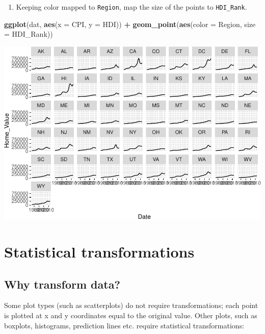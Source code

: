 \documentclass[
]{book}
\newenvironment{Shaded}{\begin{snugshade}}{\end{snugshade}}
\newcommand{\DataTypeTok}[1]{\textcolor[rgb]{0.13,0.29,0.53}{#1}}
\newcommand{\KeywordTok}[1]{\textcolor[rgb]{0.13,0.29,0.53}{\textbf{#1}}}
\newcommand{\NormalTok}[1]{#1}
\newcommand{\OperatorTok}[1]{\textcolor[rgb]{0.81,0.36,0.00}{\textbf{#1}}}
\providecommand{\tightlist}{%
  \setlength{\itemsep}{0pt}\setlength{\parskip}{0pt}}
\begin{document}
\begin{enumerate}
\def\labelenumi{\arabic{enumi}.}
\setcounter{enumi}{4}
\tightlist
\item
  Keeping color mapped to \texttt{Region}, map the size of the points to \texttt{HDI\_Rank}.
\end{enumerate}

\begin{Shaded}
\begin{Highlighting}[]
\KeywordTok{ggplot}\NormalTok{(dat, }\KeywordTok{aes}\NormalTok{(}\DataTypeTok{x =}\NormalTok{ CPI, }\DataTypeTok{y =}\NormalTok{ HDI)) }\OperatorTok{+}
\KeywordTok{geom\_point}\NormalTok{(}\KeywordTok{aes}\NormalTok{(}\DataTypeTok{color =}\NormalTok{ Region, }\DataTypeTok{size =}\NormalTok{  HDI\_Rank))}
\end{Highlighting}
\end{Shaded}

\includegraphics{R/Rgraphics/figures/unnamed-chunk-178-1.pdf}

\hypertarget{statistical-transformations}{%
\section{Statistical transformations}\label{statistical-transformations}}

\hypertarget{why-transform-data}{%
\subsection{Why transform data?}\label{why-transform-data}}

Some plot types (such as scatterplots) do not require transformations; each point is plotted at x and y coordinates equal to the original value. Other plots, such as boxplots, histograms, prediction lines etc. require statistical transformations:
\end{document}
